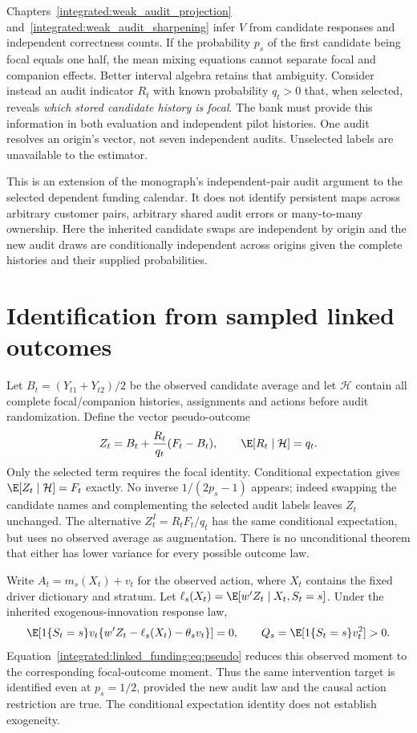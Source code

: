 Chapters~\ref{integrated:weak_audit_projection} and~\ref{integrated:weak_audit_sharpening} infer $V$ from candidate responses and independent correctness counts. If the probability $p_s$ of the first candidate being
focal equals one half, the mean mixing equations cannot separate focal and
companion effects. Better interval algebra retains that ambiguity. Consider
instead an audit indicator $R_t$ with known probability $q_t>0$ that, when
selected, reveals \emph{which stored candidate history is focal}. The bank
must provide this information in both evaluation and independent pilot
histories. One audit resolves an origin's vector, not seven independent
audits. Unselected labels are unavailable to the estimator.

This is an extension of the monograph's independent-pair audit argument to
the selected dependent funding calendar. It does not identify persistent
maps across arbitrary customer pairs, arbitrary shared audit errors or
many-to-many ownership. Here the inherited candidate swaps are independent
by origin and the new audit draws are conditionally independent across
origins given the complete histories and their supplied probabilities.

\section{Identification from sampled linked outcomes}

Let $B_t=(Y_{t1}+Y_{t2})/2$ be the observed candidate average and let
$\mathcal H$ contain all complete focal/companion histories, assignments and
actions before audit randomization. Define the vector pseudo-outcome
\begin{equation}
 Z_t=B_t+\frac{R_t}{q_t}(F_t-B_t),\qquad
 \E[R_t\mid\mathcal H]=q_t.\label{integrated:linked_funding:eq:pseudo}
\end{equation}
Only the selected term requires the focal identity. Conditional expectation
gives $\E[Z_t\mid\mathcal H]=F_t$ exactly. No inverse $1/(2p_s-1)$ appears;
indeed swapping the candidate names and complementing the selected audit
labels leaves $Z_t$ unchanged. The alternative $Z_t^{I}=R_tF_t/q_t$ has the
same conditional expectation, but uses no observed average as augmentation.
There is no unconditional theorem that either has lower variance for every
possible outcome law.

Write $A_t=m_s(X_t)+v_t$ for the observed action, where $X_t$ contains the
fixed driver dictionary and stratum. Let
$\ell_s(X_t)=\E[w'Z_t\mid X_t,S_t=s]$.
Under the inherited exogenous-innovation response law,
\begin{equation}
 \E\!\left[1\{S_t=s\}v_t
   \{w'Z_t-\ell_s(X_t)-\theta_sv_t\}\right]=0,
 \qquad Q_s=\E[1\{S_t=s\}v_t^2]>0.\label{integrated:linked_funding:eq:score}
\end{equation}
Equation~\eqref{integrated:linked_funding:eq:pseudo} reduces this observed moment to the corresponding
focal-outcome moment. Thus the same intervention target is identified even
at $p_s=1/2$, provided the new audit law and the causal action restriction
are true. The conditional expectation identity does not establish exogeneity.

